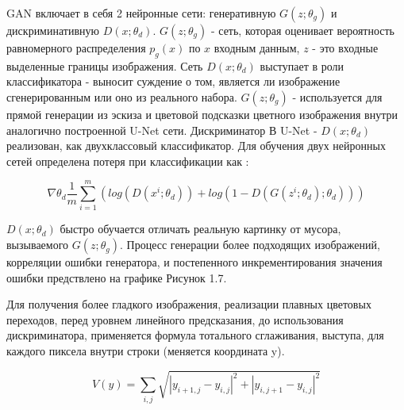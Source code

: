 GAN включает в себя 2 нейронные сети: генеративную $G(z; \theta_g)$ и дискриминативную $D(x; \theta_d)$. $G(z; \theta_g)$ - сеть, которая оценивает вероятность равномерного распределения $p_g(x)$ по $x$ входным данным, $z$ - это входные выделенные границы изображения. Сеть $D(x; \theta_d)$ выступает в роли классификатора - выносит суждение о том, является ли изображение сгенерированным или оно из реального набора.  $G(z; \theta_g)$ - используется для прямой генерации из эскиза и цветовой подсказки цветного изображения внутри аналогично построенной U-Net сети. Дискриминатор В U-Net - $D(x; \theta_d)$ реализован, как двухклассовый классификатор. Для обучения двух нейронных сетей определена потеря при классификации как :

\begin{equation}
\nabla \theta_d \frac{1}{m} \sum\limits_{i = 1}^m (log(D(x^i; 
\theta_d)) + log(1 - D(G(z^i; \theta_d); \theta_d)))
\end{equation}

$D(x; \theta_d)$ быстро обучается отличать реальную картинку от мусора, вызываемого $G(z; \theta_g)$. Процесс генерации более подходящих изображений, корреляции ошибки генератора, и постепенного инкрементирования значения ошибки предствлено на графике Рисунок 1.7. 

\begin{figure}[ht!]
\end{figure}

Для получения более гладкого изображения, реализации плавных цветовых переходов,  перед уровнем линейного предсказания, до использования дискриминатора, применяется формула тотального сглаживания, выступа, для каждого пиксела внутри строки (меняется координата y).


\begin{equation}
V(y) = \sum_{i,j} \sqrt{|y_{i+1, j} - y_{i,j}|^2 + |y_{i, j+1} - y_{i, j}|^2}
\end{equation}

